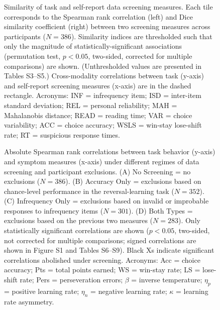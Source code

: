 \documentclass[a4paper,notitlepage,12pt]{article}
\begin{document}
\clearpage
\begin{figure}[h]
    \centering
    \caption{Similarity of task and self-report data screening measures. Each tile corresponds to the Spearman rank correlation (left) and Dice similarity coefficient (right) between two screening measures across participants ($N=386$). Similarity indices are thresholded such that only the magnitude of statistically-significant associations (permutation test, $p<0.05$, two-sided, corrected for multiple comparisons) are shown. (Unthresholded values are presented in Tables S3--S5.) Cross-modality correlations between task (y-axis) and self-report screening measures (x-axis) are in the dashed rectangle. Acronyms: INF = infrequency item; ISD = inter-item standard deviation; REL = personal reliability; MAH = Mahalanobis distance; READ = reading time; VAR = choice variability; ACC = choice accuracy; WSLS = win-stay lose-shift rate; RT = suspicious response times.}
    \label{fig:fig02}
\end{figure}

\clearpage
\begin{figure}[h]
    \centering
    \caption{Absolute Spearman rank correlations between task behavior (y-axis) and symptom measures (x-axis) under different regimes of data screening and participant exclusions. (A) No Screening = no exclusions ($N=386$). (B) Accuracy Only = exclusions based on chance-level performance in the reversal-learning task ($N=352$). (C) Infrequency Only = exclusions based on invalid or improbable responses to infrequency items ($N=301$). (D) Both Types = exclusions based on the previous two measures ($N=283$). Only statistically significant correlations are shown ($p<0.05$, two-sided, not corrected for multiple comparisons; signed correlations are shown in Figure S1 and Tables S6--S9). Black Xs indicate significant correlations abolished under screening. Acronyms: Acc = choice accuracy; Pts = total points earned; WS = win-stay rate; LS = lose-shift rate; Pers = perseveration errors; $\beta$ = inverse temperature; $\eta_p$ = positive learning rate; $\eta_n$ = negative learning rate; $\kappa$ = learning rate asymmetry.}
    \label{fig:fig03}
\end{figure}
\end{document}

